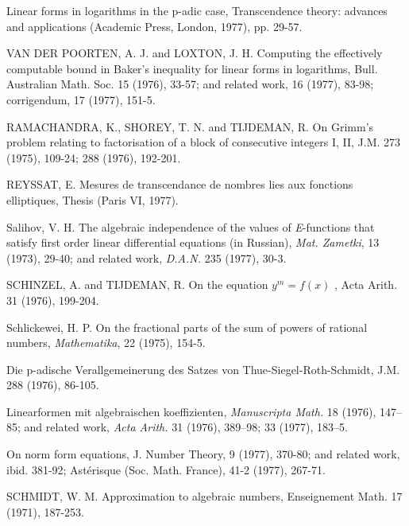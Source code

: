 \begin{hanglist}
    \item \hspace{1.5em} Linear forms in logarithms in the p-adic case, Transcendence theory: advances and applications (Academic Press, London, 1977), pp. 29-57.
    \item VAN DER POORTEN, A. J. and LOXTON, J. H. Computing the effectively computable bound in Baker's inequality for linear forms in logarithms, Bull. Australian Math. Soc. 15 (1976), 33-57; and related work, 16 (1977), 83-98; corrigendum, 17 (1977), 151-5.
    \item RAMACHANDRA, K., SHOREY, T. N. and TIJDEMAN, R. On Grimm's problem relating to factorisation of a block of consecutive integers I, II, J.M. 273 (1975), 109-24; 288 (1976), 192-201.
    \item REYSSAT, E. Mesures de transcendance de nombres lies aux fonctions elliptiques, Thesis (Paris VI, 1977).
    \item Salihov, V. H. The algebraic independence of the values of \textit{E}-functions that satisfy first order linear differential equations (in Russian), \textit{Mat. Zametki}, 13 (1973), 29-40; and related work, \textit{D.A.N.} 235 (1977), 30-3.
    \item SCHINZEL, A. and TIJDEMAN, R. On the equation  $y^m = f(x)$ , Acta Arith. 31 (1976), 199-204.
    \item Schlickewei, H. P. On the fractional parts of the sum of powers of rational numbers, \textit{Mathematika}, 22 (1975), 154-5.
    \item \hspace{1.5em} Die p-adische Verallgemeinerung des Satzes von Thue-Siegel-Roth-Schmidt, J.M. 288 (1976), 86-105.
    \item \hspace{1.5em} Linearformen mit algebraischen koeffizienten, \textit{Manuscripta Math.} 18 (1976), 147–85; and related work, \textit{Acta Arith.} 31 (1976), 389–98; 33 (1977), 183–5.
    \item \hspace{1.5em} On norm form equations, J. Number Theory, 9 (1977), 370-80; and related work, ibid. 381-92; Astérisque (Soc. Math. France), 41-2 (1977), 267-71.
    \item SCHMIDT, W. M. Approximation to algebraic numbers, Enseignement Math. 17 (1971), 187-253.

\end{hanglist}

